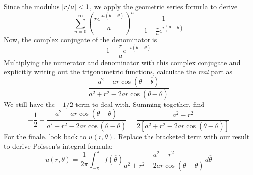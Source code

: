 \documentclass[a4paper]{article}
\begin{document}
Since the modulus \( \abs{r / a} < 1 \), we apply the geometric series formula to derive
\[
	\sum^{\infty}_{n=0} \!\left( \frac{re^{in \!\left( \theta - \overline{\theta} \right)}}{a} \right)^{n} = \frac{1}{1 - \frac{r}{a}e^{i \!\left( \theta - \overline{\theta} \right)}}
\]
Now, the complex conjugate of the denominator is
\[
	1 - \frac{r}{a}e^{-i \!\left( \theta - \overline{\theta} \right)} 
\]
Multiplying the numerator and denominator with this complex conjugate and explicitly writing out the trigonometric functions, calculate the \textit{real} part as
\[
	\frac{a^{2} - ar \cos\!\left(\theta - \overline{\theta}\right)}{a^{2} + r^{2} - 2ar \cos\!\left(\theta - \overline{\theta}\right)} 
\]
We still have the \( -1/2 \) term to deal with. Summing together, find
\[
	-\frac{1}{2} + \frac{a^{2} - ar \cos\!\left(\theta - \overline{\theta}\right)}{a^{2} + r^{2} - 2ar \cos\!\left(\theta - \overline{\theta}\right)} = \frac{a^{2} - r^{2}}{2 \left[ a^{2} + r^{2} - 2ar \cos\!\left(\theta - \overline{\theta}\right) \right]}
\]
For the finale, look back to \( u \!\left( r,\theta \right) \). Replace the bracketed term with our result to derive Poisson's integral formula:
\[
	u \!\left( r,\theta \right) = \frac{1}{2 \pi}\int^{\pi}_{-\pi} f \!\left( \overline{\theta} \right)\frac{a^{2} - r^{2}}{a^{2} + r^{2} - 2ar \cos\!\left(\theta - \overline{\theta}\right)} \, d \overline{\theta} 
\]

\end{document}

